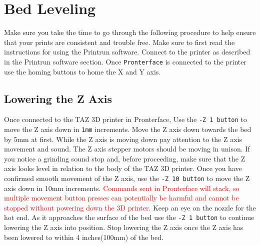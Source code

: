 \section{Bed Leveling}
Make sure you take the time to go through the following procedure to help ensure that your prints are consistent and trouble free. Make sure to first read the instructions for using the Printrun software. Connect to the printer as described in the Printrun software section. Once \texttt{Pronterface} is connected to the printer use the homing buttons to home the X and Y axis. 

\subsection{Lowering the Z Axis}
Once connected to the TAZ 3D printer in Pronterface, Use the \texttt{-Z 1 button} to move the Z axis down in \texttt{1mm} increments. Move the Z axis down towards the bed by 5mm at first. While the Z axis is moving down pay attention to the Z axis movement and sound. The Z axis stepper motors should be moving in unison. If you notice a grinding sound stop and, before proceeding, make sure that the Z axis looks level in relation to the body of the TAZ 3D printer. Once you have confirmed smooth movement of the Z axis, use the \texttt{-Z 10 button} to move the Z axis down in 10mm increments. \textcolor{red}{Commands sent in Pronterface will stack, so multiple movement button presses can potentially be harmful and cannot be stopped without powering down the 3D printer.} Keep an eye on the nozzle for the hot end. As it approaches the surface of the bed use the \texttt{-Z 1 button} to continue lowering the Z axis into position. Stop lowering the Z axis once the Z axis has been lowered to within 4 inches(100mm) of the bed.

